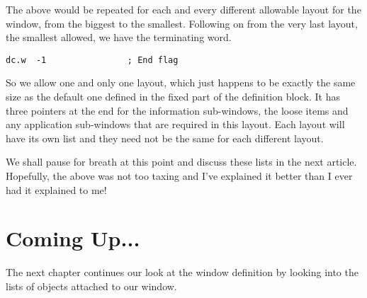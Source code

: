 The above would be repeated for each and every different allowable
    layout for the window, from the biggest to the smallest. Following on from the very last layout, the smallest allowed, we have the terminating word.

\begin{lstlisting}[firstnumber=last,caption={Main Window - Repeating Part - End Flag}]
           dc.w  -1                ; End flag
\end{lstlisting}

So we allow one and only one layout, which just happens to be
    exactly the same size as the default one defined in the fixed part of the
    definition block. It has three pointers at the end for the information
    sub-{}windows, the loose items and any application sub-{}windows that are
    required in this layout. Each layout will have its own list and they need
    not be the same for each different layout.

We shall pause for breath at this point and discuss these lists in
    the next article. Hopefully, the above was not too taxing and I've
    explained it better than I ever had it explained to me!

\section{Coming Up...}
\label{ch22-the-end}%

The next chapter continues our look at the window definition by looking
    into the lists of objects attached to our window.


